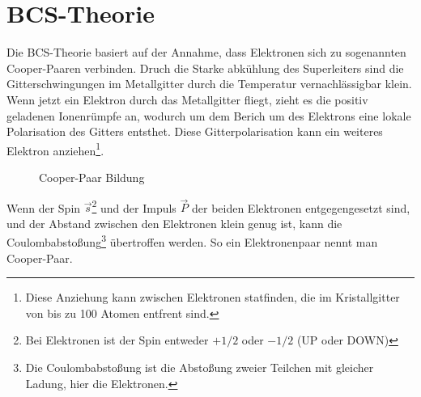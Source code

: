 \section{BCS-Theorie}
Die BCS-Theorie basiert auf der Annahme, dass Elektronen sich zu sogenannten Cooper-Paaren verbinden. 
Druch die Starke abkühlung des Superleiters sind die Gitterschwingungen im Metallgitter durch die Temperatur 
vernachlässigbar klein. Wenn jetzt ein Elektron durch das Metallgitter fliegt, zieht es die positiv geladenen
Ionenrümpfe an, wodurch um dem Berich um des Elektrons eine lokale Polarisation des Gitters entsthet. Diese 
Gitterpolarisation kann ein weiteres Elektron anziehen\footnote{Diese Anziehung kann zwischen Elektronen statfinden, die im Kristallgitter von bis zu 100 Atomen entfrent sind.}. 

\begin{figure}[!ht]
    \centering
    \caption{Cooper-Paar Bildung}
    \label{fig:CooperPaar}
\end{figure}
Wenn der Spin $\overrightarrow{s}$\footnote{Bei Elektronen ist der Spin entweder $+1/2$ oder $-1/2$ (UP oder DOWN)} und der Impuls $\overrightarrow{P}$ der beiden Elektronen entgegengesetzt sind, und der 
Abstand zwischen den Elektronen klein genug ist, kann die Coulombabstoßung\footnote{Die Coulombabstoßung ist die Abstoßung zweier Teilchen mit gleicher Ladung, hier die Elektronen.} übertroffen werden. So ein Elektronenpaar nennt man
Cooper-Paar. 

